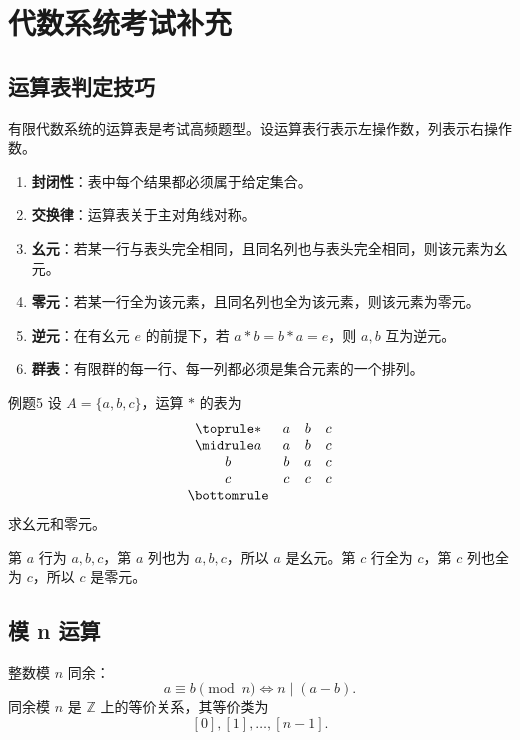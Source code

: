 \section{代数系统考试补充}

\subsection{运算表判定技巧}

有限代数系统的运算表是考试高频题型。设运算表行表示左操作数，列表示右操作数。
\begin{enumerate}
	\item \textbf{封闭性}：表中每个结果都必须属于给定集合。
	\item \textbf{交换律}：运算表关于主对角线对称。
	\item \textbf{幺元}：若某一行与表头完全相同，且同名列也与表头完全相同，则该元素为幺元。
	\item \textbf{零元}：若某一行全为该元素，且同名列也全为该元素，则该元素为零元。
	\item \textbf{逆元}：在有幺元 \(e\) 的前提下，若 \(a*b=b*a=e\)，则 \(a,b\) 互为逆元。
	\item \textbf{群表}：有限群的每一行、每一列都必须是集合元素的一个排列。
\end{enumerate}

\begin{question}{例题5}
	设 \(A=\{a,b,c\}\)，运算 \(*\) 的表为
	\[
	\begin{array}{cccc}
	\toprule
	*&a&b&c\\
	\midrule
	a&a&b&c\\
	b&b&a&c\\
	c&c&c&c\\
	\bottomrule
	\end{array}
	\]
	求幺元和零元。
	
	\begin{solution}
	第 \(a\) 行为 \(a,b,c\)，第 \(a\) 列也为 \(a,b,c\)，所以 \(a\) 是幺元。第 \(c\) 行全为 \(c\)，第 \(c\) 列也全为 \(c\)，所以 \(c\) 是零元。
	\end{solution}
\end{question}

\subsection{模 n 运算}

整数模 \(n\) 同余：
\[
a\equiv b\pmod n\Leftrightarrow n\mid(a-b).
\]
同余模 \(n\) 是 \(\mathbb Z\) 上的等价关系，其等价类为
\[
[0],[1],\dots,[n-1].
\]

